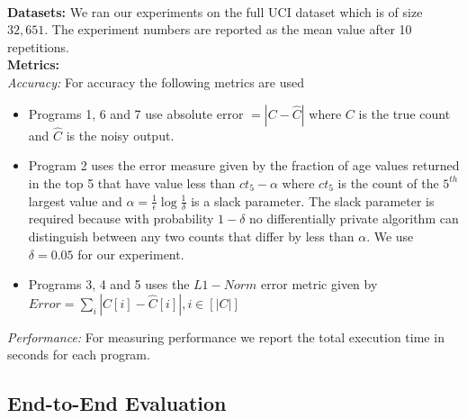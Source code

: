 \\\textbf{Datasets:}
We ran our experiments on the full UCI dataset \cite{UCI} which is of size $32,651$. The experiment numbers are reported as the mean value after 10 repetitions.
\\\textbf{Metrics:}
\\\textit{Accuracy:} For accuracy the following metrics are used
\begin{itemize}\item Programs 1, 6 and 7 use absolute error $ =|C-\hat{C}|$ where $C$ is the true count and $\hat{C}$ is the noisy  output. \item Program 2 uses the error measure given by the fraction of age values returned in the top 5 that have value less than $ct_5-\alpha$  where  $ct_5$ is the count of the $5^{th}$ largest value and $\alpha=\frac{1}{\epsilon}\log\frac{1}{\delta}$ is a slack parameter. The slack parameter is required because with probability $1-\delta$ no differentially private algorithm can distinguish between any two counts that differ by less than $\alpha$. We use $\delta=0.05$ for our experiment. \item Programs 3, 4 and 5 uses the $L1-Norm$ error metric given  by $Error=\sum_{i}|C[i]-\hat{C}[i]|, i \in [|C|]$ \end{itemize}
\textit{Performance:} For measuring performance we report the total execution time in seconds for each program.
\subsection{End-to-End Evaluation}

